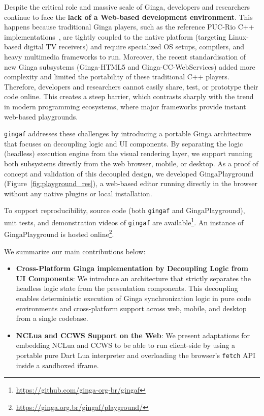 \documentclass[sigconf,authorversion,review,authordraft]{webmedia}
\newcommand{\projectname}{\texttt{gingaf}}
\begin{document}
Despite the critical role and massive scale of Ginga, developers and researchers continue to face the \textbf{lack of a Web-based development environment}. This happens because traditional Ginga players, such as the reference PUC-Rio C++ implementations~\cite{ginga2013, ginga2018}, are tightly coupled to the native platform (targeting Linux-based digital TV receivers) and require specialized OS setups, compilers, and heavy multimedia frameworks to run. Moreover, the recent standardisation of new Ginga subsystems (Ginga-HTML5 and Ginga-CC-WebServices) added more complexity and limited the portability of these traditional C++ players. Therefore, developers and researchers cannot easily share, test, or prototype their code online. This creates a steep barrier, which contrasts sharply with the trend in modern programming ecosystems, where major frameworks provide instant web-based playgrounds.

\projectname{} addresses these challenges by introducing a portable Ginga architecture that focuses on decoupling logic and UI components.  By separating the logic (headless) execution engine from the visual rendering layer, we support running both subsystems directly from the web browser, mobile, or desktop. As a proof of concept and validation of this decoupled design, we developed GingaPlayground (Figure~\ref{fig:playground_res}), a web-based editor running directly in the browser without any native plugins or local installation.

To support reproducibility, source code (both \projectname{} and GingaPlayground), unit tests, and demonstration videos of \projectname{} are available\footnote{\url{https://github.com/ginga-org-br/gingaf}}. An instance of GingaPlayground is hosted online\footnote{\url{https://ginga.org.br/gingaf/playground/}}.

We summarize our main contributions below:

\begin{itemize}
  \item \textbf{Cross-Platform Ginga implementation by Decoupling Logic from UI Components}: We introduce an architecture that strictly separates the headless logic state from the presentation components. This decoupling enables deterministic execution of Ginga synchronization logic in pure code environments and cross-platform support across web, mobile, and desktop from a single codebase.
  \item \textbf{NCLua and CCWS Support on the Web}: We present adaptations for embedding NCLua and CCWS to be able to run client-side by using a portable pure Dart Lua interpreter and overloading the browser's \texttt{fetch} API inside a sandboxed iframe.
\end{itemize}
\end{document}
